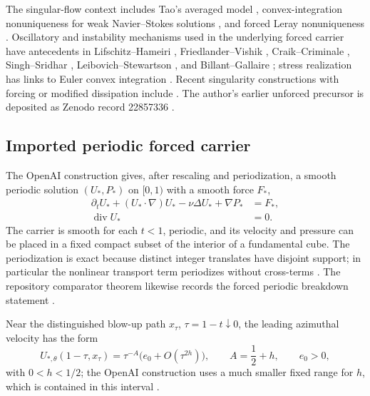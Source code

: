 \documentclass[11pt]{article}
\numberwithin{equation}{section}
\newcommand{\diver}{\operatorname{div}}
\begin{document}
The singular-flow context includes Tao's averaged model \cite{Tao2016}, convex-integration nonuniqueness for weak Navier--Stokes solutions \cite{BuckmasterVicol2019}, and forced Leray nonuniqueness \cite{AlbrittonBrueColombo2022}.  Oscillatory and instability mechanisms used in the underlying forced carrier have antecedents in Lifschitz--Hameiri \cite{LifschitzHameiri1991}, Friedlander--Vishik \cite{FriedlanderVishik1991}, Craik--Criminale \cite{CraikCriminale1986}, Singh--Sridhar \cite{SinghSridhar2017}, Leibovich--Stewartson \cite{LeibovichStewartson1983}, and Billant--Gallaire \cite{BillantGallaire2005,BillantGallaire2013}; stress realization has links to Euler convex integration \cite{DaneriSzekelyhidi2017}.  Recent singularity constructions with forcing or modified dissipation include \cite{CordobaMartinezZoroa2023,CordobaMartinezZoroa2024,CordobaMartinezZoroaZheng2026}.  The author's earlier unforced precursor is deposited as Zenodo record 22857336 \cite{NewtonZenodo22857336}.

\subsection{Imported periodic forced carrier}
The OpenAI construction gives, after rescaling and periodization, a smooth periodic solution \((U_*,P_*)\) on \([0,1)\) with a smooth force \(F_*\),
\begin{align}
\partial_tU_*+(U_*\cdot\nabla)U_* -\nu\Delta U_*+\nabla P_*&=F_*,\label{eq:forcedcarrier}\\
\diver U_*&=0.\label{eq:forceddiv}
\end{align}
The carrier is smooth for each \(t<1\), periodic, and its velocity and pressure can be placed in a fixed compact subset of the interior of a fundamental cube.  The periodization is exact because distinct integer translates have disjoint support; in particular the nonlinear transport term periodizes without cross-terms \cite[Cor.~10.6]{OpenAI2026NS}.  The repository comparator theorem likewise records the forced periodic breakdown statement \cite{OpenAIRepo2026}.

Near the distinguished blow-up path \(x_\tau\), \(\tau=1-t\downarrow0\), the leading azimuthal velocity has the form
\begin{equation}
U_{*,\theta}(1-\tau,x_\tau)=\tau^{-A}\bigl(e_0+O(\tau^{2h})\bigr),
\qquad
A=\frac12+h,
\qquad e_0>0,
\label{eq:carrierblow}
\end{equation}
with \(0<h<1/2\); the OpenAI construction uses a much smaller fixed range for \(h\), which is contained in this interval \cite{OpenAI2026NS}.
\end{document}
